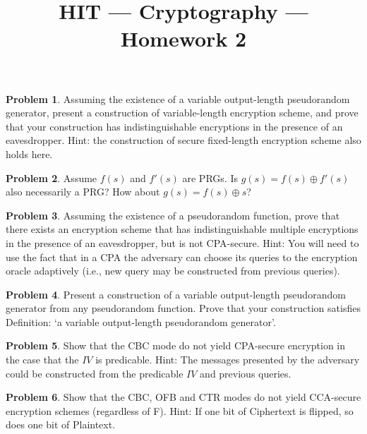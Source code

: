 \documentclass[11pt]{article}
\title{HIT --- Cryptography --- Homework 2}
\theoremstyle{definition}
\newtheorem{problem}{Problem}
\begin{document}
\maketitle

\begin{problem}
Assuming the existence of a variable output-length pseudorandom generator, present a construction of variable-length encryption scheme, and prove that your construction has indistinguishable encryptions in the presence of an eavesdropper. {\small Hint: the construction of secure fixed-length encryption scheme also holds here.}
\end{problem}

\begin{problem}
Assume $f(s)$ and $f'(s)$ are PRGs. Is $g(s)=f(s) \oplus f'(s)$ also necessarily a PRG? How about $g(s)=f(s) \oplus s$?
\end{problem}

\begin{problem}
Assuming the existence of a pseudorandom function, prove that there exists an encryption scheme that has indistinguishable multiple encryptions in the presence of an eavesdropper, but is not CPA-secure.
{\small Hint: You will need to use the fact that in a CPA the adversary can choose its queries to the encryption oracle adaptively (i.e., new query may be constructed from previous queries).}
\end{problem}


\begin{problem}
Present a construction of a variable output-length pseudorandom generator from any pseudorandom function. Prove that your construction satisfies Definition: `a variable output-length pseudorandom generator'.
\end{problem}

\begin{problem}
Show that the CBC mode do not yield CPA-secure encryption in the case that the $IV$ is predicable. {\small Hint: The messages presented by the adversary could be constructed from the predicable $IV$ and previous queries.}
\end{problem}

\begin{problem}
Show that the CBC, OFB and CTR modes do not yield CCA-secure encryption schemes (regardless of F). {\small Hint: If one bit of Ciphertext is flipped, so does one bit of Plaintext.}
\end{problem}
\end{document}
